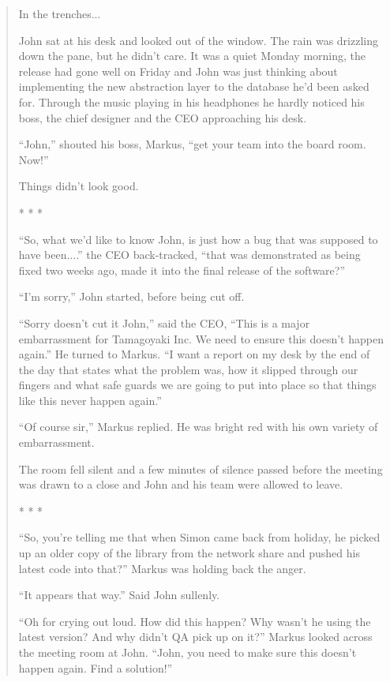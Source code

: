 \begin{quote}In the trenches...

John sat at his desk and looked out of the window.  The rain was drizzling down the pane, but he didn't care.  It was a quiet Monday morning, the release had gone well on Friday and John was just thinking about implementing the new abstraction layer to the database he'd been asked for.  Through the music playing in his headphones he hardly noticed his boss, the chief designer and the CEO approaching his desk.  

``John,'' shouted his boss, Markus, ``get your team into the board room.  Now!''

Things didn't look good. 
 
\begin{center} * * * \end{center}

``So, what we'd like to know John, is just how a bug that was supposed to have been....'' the CEO back-tracked, ``that was demonstrated as being fixed two weeks ago, made it into the final release of the software?''

``I'm sorry,'' John started, before being cut off.

``Sorry doesn't cut it John,'' said the CEO, ``This is a major embarrassment for Tamagoyaki Inc.  We need to ensure this doesn't happen again.''  He turned to Markus.  ``I want a report on my desk by the end of the day that states what the problem was, how it slipped through our fingers and what safe guards we are going to put into place so that things like this never happen again.''

``Of course sir,'' Markus replied.  He was bright red with his own variety of embarrassment.

The room fell silent and a few minutes of silence passed before the meeting was drawn to a close and John and his team were allowed to leave.

\begin{center} * * * \end{center}

``So, you're telling me that when Simon came back from holiday, he picked up an older copy of the library from the network share and pushed his latest code into that?''  Markus was holding back the anger.

``It appears that way.''  Said John sullenly.

``Oh for crying out loud.  How did this happen?  Why wasn't he using the latest version?  And why didn't QA pick up on it?''  Markus looked across the meeting room at John.  ``John, you need to make sure this doesn't happen again.  Find a solution!''
\end{quote}

